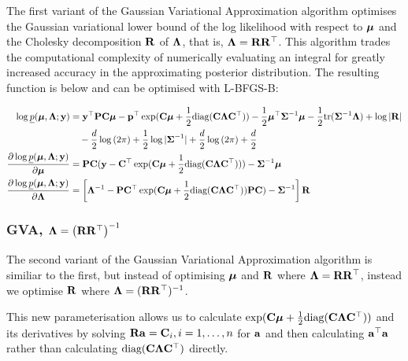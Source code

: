 \documentclass{article}[12pt]
\begin{document}
The first variant of the Gaussian Variational Approximation algorithm
optimises the Gaussian variational lower bound of the log likelihood with
respect to ${\boldsymbol \mu}$ and the Cholesky decomposition ${\bf R}$ of ${\boldsymbol \Lambda}$, that is,
${\boldsymbol \Lambda} = {\bf R} {\bf R}^\top$. This algorithm trades the computational complexity of
numerically evaluating an integral for greatly increased accuracy in the
approximating posterior distribution. The resulting function is below and  can
be optimised with L-BFGS-B:

\begin{align*}
\log \underline{p}({\boldsymbol \mu}, {\boldsymbol \Lambda}; {\bf y}) &= {\bf y}^\top{\bf P} {\bf C} {\boldsymbol\mu} - {\bf p}^\top \exp({\bf C} {\boldsymbol \mu} + {\frac{1}{2}} \text{diag}({\bf C} {\boldsymbol \Lambda} {\bf C}^\top)) - {\frac{1}{2}} {\boldsymbol \mu}^\top {\boldsymbol\Sigma}^{-1} {\boldsymbol \mu} - {\frac{1}{2}} \text{tr}{({\boldsymbol\Sigma}^{-1} {\boldsymbol\Lambda})} + \log{|{\bf R}|} \\
&\quad - \frac{d}{2} \log{(2 \pi)} + {\frac{1}{2}} \log{|{\boldsymbol\Sigma}^{-1}|} + \frac{d}{2} \log{(2 \pi)} + \frac{d}{2} \\
\frac{\partial \log \underline{p}({\boldsymbol \mu}, {\boldsymbol \Lambda}; {\bf y})}{\partial {\boldsymbol\mu}} &= {\bf P} {\bf C} ({\bf y} - {\bf C}^\top \exp({\bf C} {\boldsymbol \mu} + {\frac{1}{2}} \text{diag}{({\bf C}{\boldsymbol\Lambda}{\bf C}^\top)})) - {\boldsymbol \Sigma}^{-1} {\boldsymbol \mu} \\
\frac{\partial \log \underline{p}({\boldsymbol \mu}, {\boldsymbol \Lambda}; {\bf y})}{\partial {\boldsymbol\Lambda}} &= \left [{\boldsymbol \Lambda}^{-1} - {\bf P} {\bf C}^\top \exp({\bf C} {\boldsymbol \mu} + {\frac{1}{2}} \text{diag}({\bf C} {\boldsymbol \Lambda} {\bf C}^\top)) {\bf P} {\bf C}) - {\boldsymbol \Sigma}^{-1} \right ] {\bf R}
\end{align*}

\subsubsection{GVA, ${\boldsymbol \Lambda} = \left ({\bf R} {\bf R}^\top \right )^{-1}$}
The second variant of the Gaussian Variational Approximation algorithm is similiar 
to the first, but instead of optimising ${\boldsymbol \mu}$ and ${\bf R}$ where ${\boldsymbol \Lambda}={\bf R} {\bf R}^\top$,
instead we optimise ${\bf R}$ where ${\boldsymbol \Lambda} = ({\bf R} {\bf R}^\top)^{-1}$.

\noindent This new parameterisation allows us to calculate $\exp({\bf C} {\boldsymbol \mu} + {\frac{1}{2}}
\text{diag}({\bf C} {\boldsymbol \Lambda} {\bf C}^\top))$ and its derivatives by solving ${\bf R} {\bf a} = {\bf C}_{i},
 i=1, \ldots, n$ for ${\bf a}$ and then calculating ${\bf a}^\top{\bf a}$ rather than calculating
$\text{diag}({\bf C} {\boldsymbol \Lambda} {\bf C}^\top)$ directly.

\end{document}
